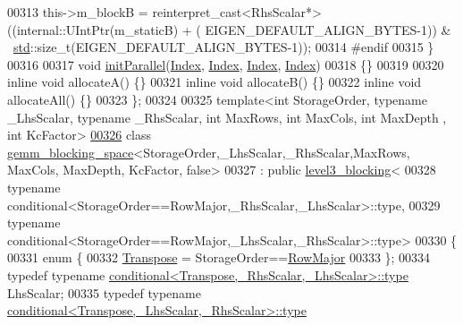 \begin{DoxyCode}
00313       this->m\_blockB = \textcolor{keyword}{reinterpret\_cast<}RhsScalar*\textcolor{keyword}{>}((internal::UIntPtr(m\_staticB) + (
      EIGEN\_DEFAULT\_ALIGN\_BYTES-1)) & ~\hyperlink{namespacestd}{std}::size\_t(EIGEN\_DEFAULT\_ALIGN\_BYTES-1));
00314 \textcolor{preprocessor}{#endif}
00315     \}
00316 
00317     \textcolor{keywordtype}{void} \hyperlink{namespace_eigen_a820c0e0460934cc17eb6dacbad54a9f5}{initParallel}(\hyperlink{namespace_eigen_a62e77e0933482dafde8fe197d9a2cfde}{Index}, \hyperlink{namespace_eigen_a62e77e0933482dafde8fe197d9a2cfde}{Index}, \hyperlink{namespace_eigen_a62e77e0933482dafde8fe197d9a2cfde}{Index}, \hyperlink{namespace_eigen_a62e77e0933482dafde8fe197d9a2cfde}{Index})
00318     \{\}
00319 
00320     \textcolor{keyword}{inline} \textcolor{keywordtype}{void} allocateA() \{\}
00321     \textcolor{keyword}{inline} \textcolor{keywordtype}{void} allocateB() \{\}
00322     \textcolor{keyword}{inline} \textcolor{keywordtype}{void} allocateAll() \{\}
00323 \};
00324 
00325 \textcolor{keyword}{template}<\textcolor{keywordtype}{int} StorageOrder, \textcolor{keyword}{typename} \_LhsScalar, \textcolor{keyword}{typename} \_RhsScalar, \textcolor{keywordtype}{int} MaxRows, \textcolor{keywordtype}{int} MaxCols, \textcolor{keywordtype}{int} MaxDepth
      , \textcolor{keywordtype}{int} KcFactor>
\hyperlink{class_eigen_1_1internal_1_1gemm__blocking__space_3_01_storage_order_00_01___lhs_scalar_00_01___rbcde58016e0f2e47700c92659db0c8a7}{00326} \textcolor{keyword}{class }\hyperlink{class_eigen_1_1internal_1_1gemm__blocking__space}{gemm\_blocking\_space}<StorageOrder,\_LhsScalar,\_RhsScalar,MaxRows, MaxCols, MaxDepth,
       KcFactor, false>
00327   : \textcolor{keyword}{public} \hyperlink{class_eigen_1_1internal_1_1level3__blocking}{level3\_blocking}<
00328       typename conditional<StorageOrder==RowMajor,\_RhsScalar,\_LhsScalar>::type,
00329       typename conditional<StorageOrder==RowMajor,\_LhsScalar,\_RhsScalar>::type>
00330 \{
00331     \textcolor{keyword}{enum} \{
00332       \hyperlink{group___core___module_class_eigen_1_1_transpose}{Transpose} = StorageOrder==\hyperlink{group__enums_ggaacded1a18ae58b0f554751f6cdf9eb13acfcde9cd8677c5f7caf6bd603666aae3}{RowMajor}
00333     \};
00334     \textcolor{keyword}{typedef} \textcolor{keyword}{typename} \hyperlink{class_eigen_1_1internal_1_1_tensor_lazy_evaluator_writable}{conditional<Transpose,\_RhsScalar,\_LhsScalar>::type}
       LhsScalar;
00335     \textcolor{keyword}{typedef} \textcolor{keyword}{typename} \hyperlink{class_eigen_1_1internal_1_1_tensor_lazy_evaluator_writable}{conditional<Transpose,\_LhsScalar,\_RhsScalar>::type}

\end{DoxyCode}
